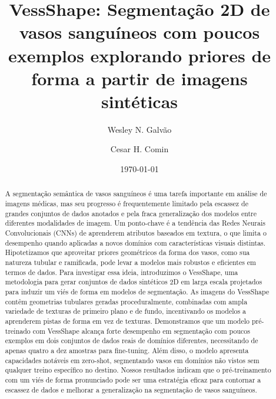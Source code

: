 \documentclass[%
reprint,
nofootinbib,
 amsmath,amssymb,
aps,
floatfix,
superscriptaddress,
showkeys,
longbibliography
]{revtex4-1}
\begin{document}
%



\title{VessShape: Segmentação 2D de vasos sanguíneos com poucos exemplos explorando priores de forma a partir de imagens sintéticas}

\author{Wesley N. Galvão}


\author{Cesar H. Comin}

\date{\today}%

\begin{abstract}

A segmentação semântica de vasos sanguíneos é uma tarefa importante em análise de imagens médicas, mas seu progresso é frequentemente limitado pela escassez de grandes conjuntos de dados anotados e pela fraca generalização dos modelos entre diferentes modalidades de imagem. Um ponto-chave é a tendência das Redes Neurais Convolucionais (CNNs) de aprenderem atributos baseados em textura, o que limita o desempenho quando aplicadas a novos domínios com características visuais distintas. Hipotetizamos que aproveitar priores geométricos da forma dos vasos, como sua natureza tubular e ramificada, pode levar a modelos mais robustos e eficientes em termos de dados. Para investigar essa ideia, introduzimos o VessShape, uma metodologia para gerar conjuntos de dados sintéticos 2D em larga escala projetados para induzir um viés de forma em modelos de segmentação. As imagens do VessShape contêm geometrias tubulares geradas proceduralmente, combinadas com ampla variedade de texturas de primeiro plano e de fundo, incentivando os modelos a aprenderem pistas de forma em vez de texturas. Demonstramos que um modelo pré-treinado com VessShape alcança forte desempenho em segmentação com poucos exemplos em dois conjuntos de dados reais de domínios diferentes, necessitando de apenas quatro a dez amostras para fine-tuning. Além disso, o modelo apresenta capacidades notáveis em zero-shot, segmentando vasos em domínios não vistos sem qualquer treino específico no destino. Nossos resultados indicam que o pré-treinamento com um viés de forma pronunciado pode ser uma estratégia eficaz para contornar a escassez de dados e melhorar a generalização na segmentação de vasos sanguíneos.

\end{abstract}
\end{document}
